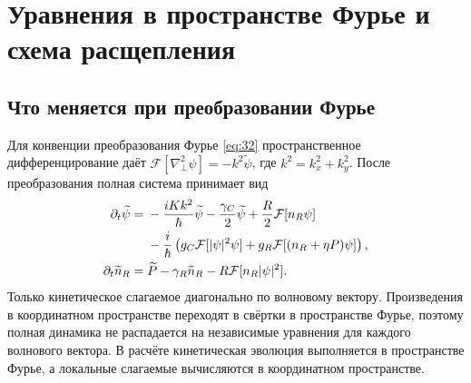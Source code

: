\documentclass[12pt,a4paper]{article}
\begin{document}
\section{Уравнения в пространстве Фурье и схема расщепления}\label{sec:B}

\subsection{Что меняется при преобразовании Фурье}\label{sec:B.1}
Для конвенции преобразования Фурье \eqref{eq:32} пространственное дифференцирование даёт
\(\mathcal F[\nabla_\perp^2\psi]=-k^2\widetilde\psi\), где
\(k^2=k_x^2+k_y^2\). После преобразования полная система принимает вид
\begin{align}
\partial_t\widetilde\psi={}&-\frac{iKk^2}{\hbar}\widetilde\psi
-\frac{\gamma_C}{2}\widetilde\psi
+\frac{R}{2}\mathcal F[n_R\psi]\notag\\
&-\frac{i}{\hbar}\left(g_C\mathcal F[|\psi|^2\psi]
+g_R\mathcal F[(n_R+\eta P)\psi]\right),\label{eq:B.field}\\
\partial_t\widetilde n_R={}&\widetilde P-\gamma_R\widetilde n_R
-R\mathcal F[n_R|\psi|^2].\label{eq:B.reservoir}
\end{align}
Только кинетическое слагаемое диагонально по волновому вектору. Произведения в координатном пространстве переходят в свёртки в пространстве Фурье, поэтому полная динамика не распадается на независимые уравнения для каждого волнового вектора. В расчёте кинетическая эволюция выполняется в пространстве Фурье, а локальные слагаемые вычисляются в координатном пространстве.
\end{document}
